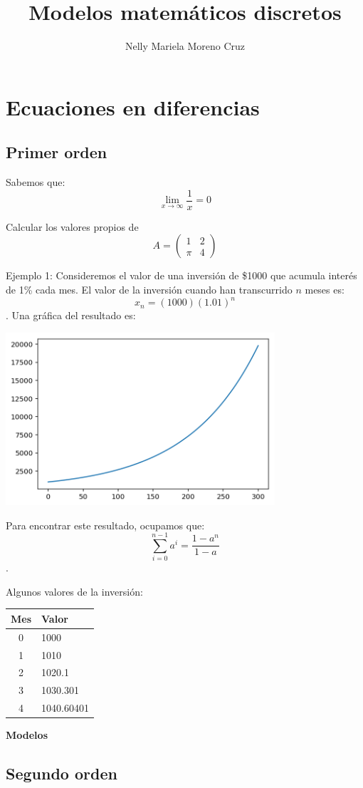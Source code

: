 \documentclass{article}
\title{Modelos matemáticos discretos}
\author{Nelly Mariela Moreno Cruz}
\begin{document}
\maketitle
\section{Ecuaciones en diferencias}
\subsection{Primer orden}
Sabemos que: $$\lim_{x\to\infty}\frac{1}{x}=0$$

Calcular los valores propios de $$A=
\begin{pmatrix}
1 & 2\\
\pi & 4
\end{pmatrix}
$$



Ejemplo 1:
Consideremos el valor de una inversión de \$1000 que acumula interés de 1\% cada mes.
El valor de la inversión cuando han transcurrido $n$ meses es: $$x_n=(1000)(1.01)^n$$.
Una gráfica del resultado es:

\begin{center}
\includegraphics[width=10cm]{graficaa}
\end{center}

Para encontrar este resultado, ocupamos que:
$$\sum_{i=0}^{n-1}a^i=\frac{1-a^{n}}{1-a}$$.

Algunos valores de la inversión:

\begin{center}
\begin{tabular}{|c|l|}
\hline
Mes & Valor\\
\hline
0 & 1000\\
\hline
1 & 1010\\
\hline
2 & 1020.1\\
\hline
3 & 1030.301\\
\hline
4 & 1040.60401\\
\hline
\end{tabular}
\end{center}

\begin{center}
\huge
\textbf{Modelos}
\end{center}

\subsection{Segundo orden}
\end{document}
